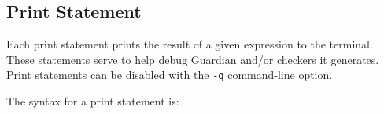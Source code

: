 
\subsection{Print Statement}
{
	Each print statement prints the result of a given expression to
	the terminal. These statements serve to help debug
	Guardian and/or checkers it
	generates.
	Print statements can be disabled with the \texttt{-q} command-line option.
	
	The syntax for a print statement is:
	\begin{lstlisting}[numbers=none, texcl = true, language = MAIA]
%print: <expression>;
	\end{lstlisting}
}
